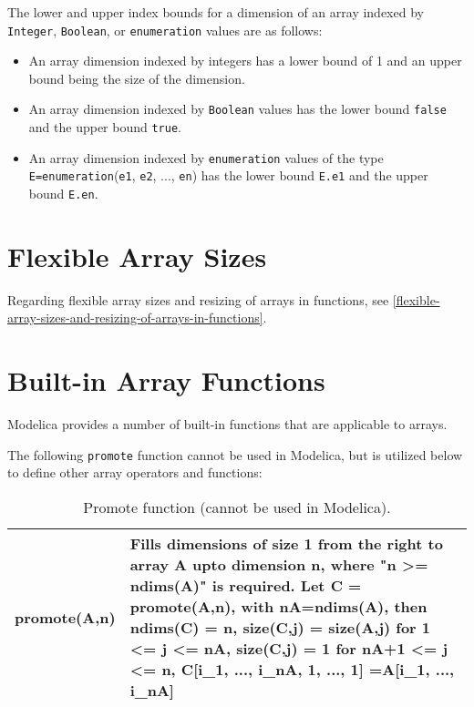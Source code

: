 The lower and upper index bounds for a dimension of an array indexed by
\lstinline!Integer!, \lstinline!Boolean!, or \lstinline!enumeration! values are as follows:

\begin{itemize}
\item
  An array dimension indexed by integers has a lower bound of 1 and an
  upper bound being the size of the dimension.
\item
  An array dimension indexed by \lstinline!Boolean! values has the lower bound \lstinline!false!
  and the upper bound \lstinline!true!.
\item
  An array dimension indexed by \lstinline!enumeration! values of the type
  \lstinline!E=enumeration!(\lstinline!e1!, \lstinline!e2!, ..., \lstinline!en!) has the lower bound \lstinline!E.e1! and the upper
  bound \lstinline!E.en!.
\end{itemize}

\section{Flexible Array Sizes}

Regarding flexible array sizes and resizing of arrays in functions, see
\autoref{flexible-array-sizes-and-resizing-of-arrays-in-functions}.

\section{Built-in Array Functions}

Modelica provides a number of built-in functions that are applicable to
arrays.

The following \lstinline!promote! function cannot be used in Modelica, but is
utilized below to define other array operators and functions:

\begin{longtable}[]{|l|p{9cm}|}
\caption{Promote function (cannot be used in Modelica).}\\
\hline \endhead
promote(A,n) & Fills dimensions of size 1 from the right to array A upto
dimension n, where "n \textgreater{}= ndims(A)" is required. Let C =
promote(A,n), with nA=ndims(A), then ndims(C) = n, size(C,j) = size(A,j)
for 1 \textless{}= j \textless{}= nA, size(C,j) = 1 for nA+1 <= j <= n, C{[}i\_1, ..., i\_nA, 1, ..., 1{]} =A{[}i\_1, ..., i\_nA{]}\\ \hline
\end{longtable}

